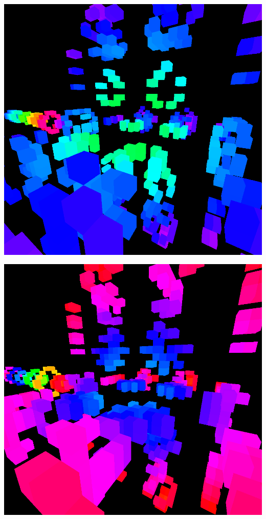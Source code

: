 \documentclass[11pt]{article}
\begin{document}
\begin{center}
\includegraphics[width=.9\linewidth]{4.png}
\end{center}

\begin{center}
\includegraphics[width=.9\linewidth]{5.png}
\end{center}
\end{document}
